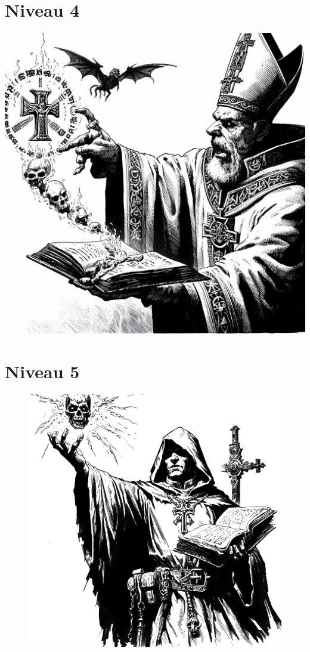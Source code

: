 \section{Niveau 4}




\vspace*{\fill}\columnbreak


\begin{center}
  \includegraphics[width=0.8\columnwidth]{img/mal.jpg}
\end{center}

\newpage
\section{Niveau 5}





\vspace*{\fill}\columnbreak


\goOneColumns
\begin{figure}[hb]
  \centering
  \includegraphics[width=0.8\columnwidth]{img/bad.png}
\end{figure}
\goTwoColumns

